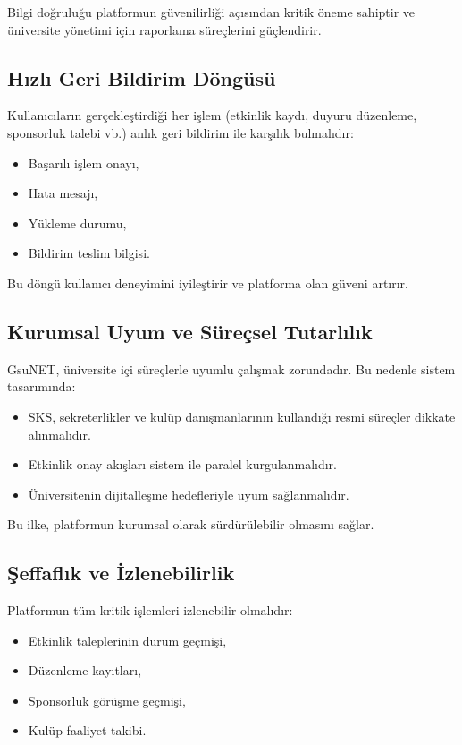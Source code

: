 \documentclass[a4paper,12pt]{report}
\begin{document}
Bilgi doğruluğu platformun güvenilirliği açısından kritik öneme sahiptir ve üniversite yönetimi için raporlama süreçlerini güçlendirir.

\subsection{Hızlı Geri Bildirim Döngüsü}

Kullanıcıların gerçekleştirdiği her işlem (etkinlik kaydı, duyuru düzenleme, sponsorluk talebi vb.) anlık geri bildirim ile karşılık bulmalıdır:

\begin{itemize}
    \item Başarılı işlem onayı,
    \item Hata mesajı,
    \item Yükleme durumu,
    \item Bildirim teslim bilgisi.
\end{itemize}

Bu döngü kullanıcı deneyimini iyileştirir ve platforma olan güveni artırır.

\subsection{Kurumsal Uyum ve Süreçsel Tutarlılık}

GsuNET, üniversite içi süreçlerle uyumlu çalışmak zorundadır. Bu nedenle sistem tasarımında:

\begin{itemize}
    \item SKS, sekreterlikler ve kulüp danışmanlarının kullandığı resmi süreçler dikkate alınmalıdır.
    \item Etkinlik onay akışları sistem ile paralel kurgulanmalıdır.
    \item Üniversitenin dijitalleşme hedefleriyle uyum sağlanmalıdır.
\end{itemize}

Bu ilke, platformun kurumsal olarak sürdürülebilir olmasını sağlar.

\subsection{Şeffaflık ve İzlenebilirlik}

Platformun tüm kritik işlemleri izlenebilir olmalıdır:

\begin{itemize}
    \item Etkinlik taleplerinin durum geçmişi,
    \item Düzenleme kayıtları,
    \item Sponsorluk görüşme geçmişi,
    \item Kulüp faaliyet takibi.
\end{itemize}
\end{document}
